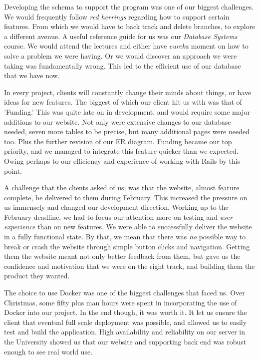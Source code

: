 \documentclass{l3proj}
\begin{document}
Developing the schema to support the program was one of our biggest challenges. We would frequently follow \textit{red herrings} regarding how to support certain features. From which we would have to back track and delete branches, to explore a different avenue. A useful reference guide for us was our \textit{Database Systems} course. We would attend the lectures and either have \textit{eureka} moment on how to solve a problem we were having. Or we would discover an approach we were taking was fundamentally wrong. This led to the efficient use of our database that we have now.

In every project, clients will constantly change their minds about things, or have ideas for new features. The biggest of which our client hit us with was that of 'Funding.' This was quite late on in development, and would require some major additions to our website. Not only were extensive changes to our database needed, seven more tables to be precise, but many additional pages were needed too. Plus the further revision of our ER diagram. Funding became our top priority, and we managed to integrate this feature quicker than we expected. Owing perhaps to our efficiency and experience of working with Rails by this point.

A challenge that the clients asked of us; was that the website, almost feature complete, be delivered to them during February. This increased the pressure on us immensely and changed our development direction. Working up to the February deadline, we had to focus our attention more on testing and \textit{user experience} than on new features. We were able to successfully deliver the website in a fully functional state. By that, we mean that there was \textit{no} possible way to break or crash the website through simple button clicks and navigation. Getting them the website meant not only better feedback from them, but gave us the confidence and motivation that we were on the right track, and building them the product they wanted.

The choice to use Docker was one of the biggest challenges that faced us. Over Christmas, some fifty plus man hours were spent in incorporating the use of Docker into our project. In the end though, it was worth it. It let us ensure the client that eventual full scale deployment was possible, and allowed us to easily test and build the application. High availability and reliability on our server in the University showed us that our website and supporting back end was robust enough to see real world use.
\end{document}
